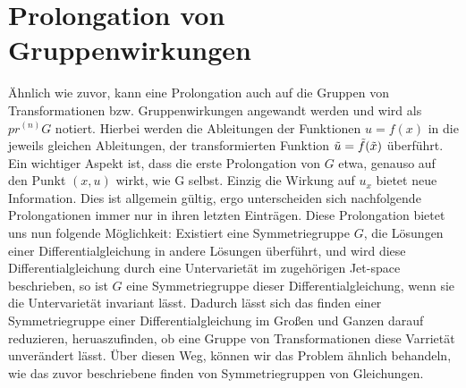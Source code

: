 \documentclass[a4paper]{article}
\begin{document}
\section{Prolongation von Gruppenwirkungen} Ähnlich wie zuvor,
kann eine Prolongation auch auf die Gruppen von Transformationen
bzw. Gruppenwirkungen angewandt werden und wird als $pr^{(n)} G$
notiert. Hierbei werden die Ableitungen der Funktionen $u=f(x)$
in die jeweils gleichen Ableitungen, der transformierten Funktion
$\Tilde{u}=\Tilde{f}(\Tilde{x})$ überführt. Ein wichtiger Aspekt
ist, dass die erste Prolongation von $G$ etwa, genauso auf den
Punkt $(x,u)$ wirkt, wie G selbst. Einzig die Wirkung auf $u_x$
bietet neue Information. Dies ist allgemein gültig, ergo
unterscheiden sich nachfolgende Prolongationen immer nur in ihren
letzten Einträgen.  \newline Diese Prolongation bietet uns nun
folgende Möglichkeit: Existiert eine Symmetriegruppe $G$, die
Lösungen einer Differentialgleichung in andere Lösungen
überführt, und wird diese Differentialgleichung durch eine
Untervarietät im zugehörigen Jet-space beschrieben, so ist $G$
eine Symmetriegruppe dieser Differentialgleichung, wenn sie die
Untervarietät invariant lässt. Dadurch lässt sich das finden
einer Symmetriegruppe einer Differentialgleichung im Großen und
Ganzen darauf reduzieren, heruaszufinden, ob eine Gruppe von
Transformationen diese Varrietät unverändert lässt. Über diesen
Weg, können wir das Problem ähnlich behandeln, wie das zuvor
beschriebene finden von Symmetriegruppen von Gleichungen.
\end{document}
